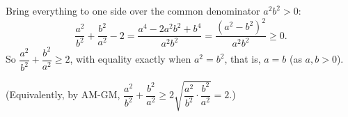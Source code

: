 Bring everything to one side over the common denominator $a^2b^2>0$:
\[\dfrac{a^2}{b^2}+\dfrac{b^2}{a^2}-2=\dfrac{a^4-2a^2b^2+b^4}{a^2b^2}=\dfrac{\left(a^2-b^2\right)^2}{a^2b^2}\ge0 .\]
So $\dfrac{a^2}{b^2}+\dfrac{b^2}{a^2}\ge2$, with equality exactly when $a^2=b^2$, that is, $\boxed{a=b}$ (as $a,b>0$).

(Equivalently, by AM-GM, $\dfrac{a^2}{b^2}+\dfrac{b^2}{a^2}\ge2\sqrt{\dfrac{a^2}{b^2}\cdot\dfrac{b^2}{a^2}}=2$.)
